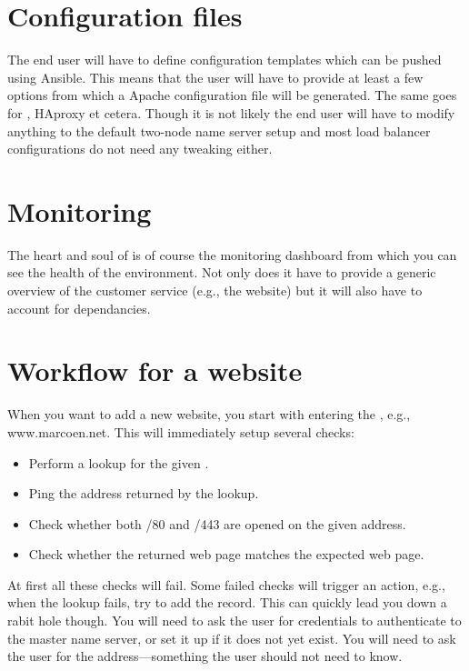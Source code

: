 \documentclass[a4paper,12pt]{scrartcl}
\begin{document}
\section{Configuration files}
The end user will have to define configuration templates which can be pushed using Ansible.
This means that the user will have to provide at least a few options from which a Apache configuration file will be generated.
The same goes for , HAproxy et cetera.
Though it is not likely the end user will have to modify anything to the default two-node name server setup and most load balancer configurations do not need any tweaking either.



\section{Monitoring}
The heart and soul of  is of course the monitoring dashboard from which you can see the health of the environment.
Not only does it have to provide a generic overview of the customer service (e.g., the website) but it will also have to account for dependancies.








\section{Workflow for a website}
When you want to add a new website, you start with entering the , e.g., www.marcoen.net.
This will immediately setup several checks:
\begin{itemize}
\item
    Perform a  lookup for the given .
\item
    Ping the  address returned by the  lookup.
\item
    Check whether both /80 and /443 are opened on the given  address.
\item
    Check whether the returned web page matches the expected web page.
\end{itemize}
At first all these checks will fail.
Some failed checks will trigger an action, e.g., when the  lookup fails, try to add the  record.
This can quickly lead you down a rabit hole though.
You will need to ask the user for credentials to authenticate to the master name server, or set it up if it does not yet exist.
You will need to ask the user for the  address---something the user should not need to know.
\end{document}
